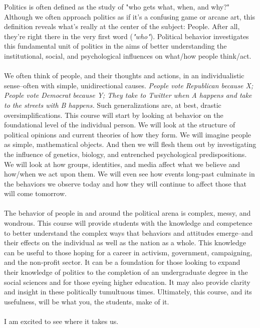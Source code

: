 \documentclass[11pt]{article}
\begin{document}
Politics is often defined as the study of "who gets what, when, and why?" Although we often approach politics as if it's a confusing game or arcane art, this definition reveals what's really at the center of the subject: People. After all, they're right there in the very first word (\textit{"who"}). Political behavior investigates this fundamental unit of politics in the aims of better understanding the institutional, social, and psychological influences on what/how people think/act.   
\\\\
We often think of people, and their thoughts and actions, in an individualistic sense--often with simple, unidirectional causes. \textit{People vote Republican because X; People vote Democrat because Y; They take to Twitter when A happens and take to the streets with B happens.} Such generalizations are, at best, drastic oversimplifications. This course will start by looking at behavior on the foundational level of the individual person. We will look at the structure of political opinions and current theories of how they form. We will imagine people as simple, mathematical objects. And then we will flesh them out by investigating the influence of genetics, biology, and entrenched psychological predispositions. We will look at how groups, identities, and media affect what we believe and how/when we act upon them. We will even see how events long-past culminate in the behaviors we observe today and how they will continue to affect those that will come tomorrow.  
\\\\
The behavior of people in and around the political arena is complex, messy, and wondrous. This course will provide students with the knowledge and competence to better understand the complex ways that behaviors and attitudes emerge--and their effects on the individual as well as the nation as a whole. This knowledge can be useful to those hoping for a career in activism, government, campaigning, and the non-profit sector. It can be a foundation for those looking to expand their knowledge of politics to the completion of an undergraduate degree in the social sciences and for those eyeing higher education. It may also provide clarity and insight in these politically tumultuous times. Ultimately, this course, and its usefulness, will be what you, the students, make of it. 
\\\\
I am excited to see where it takes us.   
\end{document}
